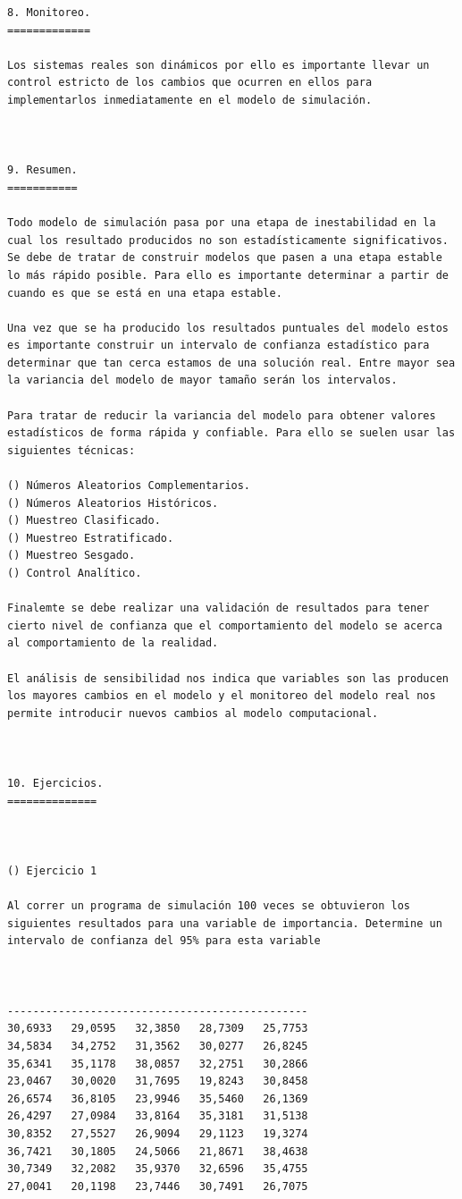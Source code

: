 \begin{verbatim}
8. Monitoreo.
=============

Los sistemas reales son dinámicos por ello es importante llevar un control estricto de los cambios que ocurren en ellos para implementarlos inmediatamente en el modelo de simulación.



9. Resumen.
===========

Todo modelo de simulación pasa por una etapa de inestabilidad en la cual los resultado producidos no son estadísticamente significativos. Se debe de tratar de construir modelos que pasen a una etapa estable lo más rápido posible. Para ello es importante determinar a partir de cuando es que se está en una etapa estable.

Una vez que se ha producido los resultados puntuales del modelo estos es importante construir un intervalo de confianza estadístico para determinar que tan cerca estamos de una solución real. Entre mayor sea la variancia del modelo de mayor tamaño serán los intervalos.

Para tratar de reducir la variancia del modelo para obtener valores estadísticos de forma rápida y confiable. Para ello se suelen usar las siguientes técnicas:

() Números Aleatorios Complementarios.
() Números Aleatorios Históricos.
() Muestreo Clasificado.
() Muestreo Estratificado.
() Muestreo Sesgado.
() Control Analítico.

Finalemte se debe realizar una validación de resultados para tener cierto nivel de confianza que el comportamiento del modelo se acerca al comportamiento de la realidad.

El análisis de sensibilidad nos indica que variables son las producen los mayores cambios en el modelo y el monitoreo del modelo real nos permite introducir nuevos cambios al modelo computacional.


 
10. Ejercicios.
==============



() Ejercicio 1

Al correr un programa de simulación 100 veces se obtuvieron los siguientes resultados para una variable de importancia. Determine un intervalo de confianza del 95% para esta variable



-----------------------------------------------
30,6933   29,0595   32,3850   28,7309   25,7753
34,5834   34,2752   31,3562   30,0277   26,8245
35,6341   35,1178   38,0857   32,2751   30,2866
23,0467   30,0020   31,7695   19,8243   30,8458
26,6574   36,8105   23,9946   35,5460   26,1369
26,4297   27,0984   33,8164   35,3181   31,5138
30,8352   27,5527   26,9094   29,1123   19,3274
36,7421   30,1805   24,5066   21,8671   38,4638
30,7349   32,2082   35,9370   32,6596   35,4755
27,0041   20,1198   23,7446   30,7491   26,7075


\end{verbatim}
